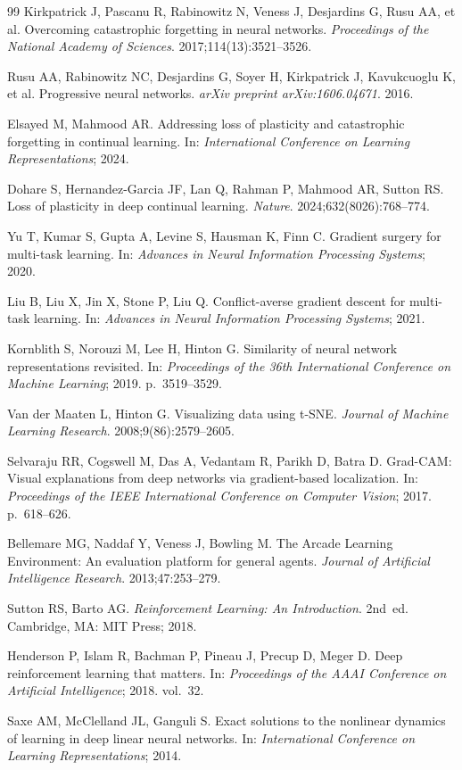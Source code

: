 \documentclass[a4paper]{article}
\begin{document}
\begin{thebibliography}{99}
Kirkpatrick J, Pascanu R, Rabinowitz N, Veness J, Desjardins G, Rusu AA, et al.
Overcoming catastrophic forgetting in neural networks.
\textit{Proceedings of the National Academy of Sciences}. 2017;114(13):3521--3526.

Rusu AA, Rabinowitz NC, Desjardins G, Soyer H, Kirkpatrick J, Kavukcuoglu K, et al.
Progressive neural networks.
\textit{arXiv preprint arXiv:1606.04671}. 2016.

Elsayed M, Mahmood AR.
Addressing loss of plasticity and catastrophic forgetting in continual learning.
In: \textit{International Conference on Learning Representations}; 2024.

Dohare S, Hernandez-Garcia JF, Lan Q, Rahman P, Mahmood AR, Sutton RS.
Loss of plasticity in deep continual learning.
\textit{Nature}. 2024;632(8026):768--774.

Yu T, Kumar S, Gupta A, Levine S, Hausman K, Finn C.
Gradient surgery for multi-task learning.
In: \textit{Advances in Neural Information Processing Systems}; 2020.

Liu B, Liu X, Jin X, Stone P, Liu Q.
Conflict-averse gradient descent for multi-task learning.
In: \textit{Advances in Neural Information Processing Systems}; 2021.

Kornblith S, Norouzi M, Lee H, Hinton G.
Similarity of neural network representations revisited.
In: \textit{Proceedings of the 36th International Conference on Machine Learning}; 2019.
p.~3519--3529.

Van der Maaten L, Hinton G.
Visualizing data using t-SNE.
\textit{Journal of Machine Learning Research}. 2008;9(86):2579--2605.

Selvaraju RR, Cogswell M, Das A, Vedantam R, Parikh D, Batra D.
Grad-CAM: Visual explanations from deep networks via gradient-based localization.
In: \textit{Proceedings of the IEEE International Conference on Computer Vision}; 2017.
p.~618--626.

Bellemare MG, Naddaf Y, Veness J, Bowling M.
The Arcade Learning Environment: An evaluation platform for general agents.
\textit{Journal of Artificial Intelligence Research}. 2013;47:253--279.

Sutton RS, Barto AG.
\textit{Reinforcement Learning: An Introduction}. 2nd~ed.
Cambridge, MA: MIT Press; 2018.

Henderson P, Islam R, Bachman P, Pineau J, Precup D, Meger D.
Deep reinforcement learning that matters.
In: \textit{Proceedings of the AAAI Conference on Artificial Intelligence}; 2018. vol.~32.

Saxe AM, McClelland JL, Ganguli S.
Exact solutions to the nonlinear dynamics of learning in deep linear neural networks.
In: \textit{International Conference on Learning Representations}; 2014.

\end{thebibliography}
\end{document}
